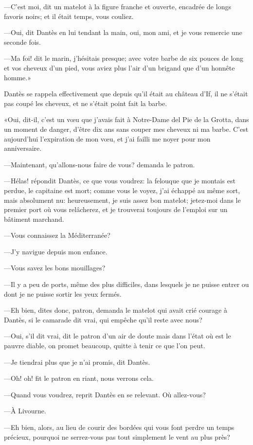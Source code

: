 —C'est moi, dit un matelot à la figure franche et ouverte, encadrée de longs favoris noirs; et il était temps, vous couliez.

—Oui, dit Dantès en lui tendant la main, oui, mon ami, et je vous remercie une seconde fois.

—Ma foi! dit le marin, j'hésitais presque; avec votre barbe de six pouces de long et vos cheveux d'un pied, vous aviez plus l'air d'un brigand que d'un honnête homme.»

Dantès se rappela effectivement que depuis qu'il était au château d'If, il ne s'était pas coupé les cheveux, et ne s'était point fait la barbe.

«Oui, dit-il, c'est un vœu que j'avais fait à Notre-Dame del Pie de la Grotta, dans un moment de danger, d'être dix ans sans couper mes cheveux ni ma barbe. C'est aujourd'hui l'expiration de mon vœu, et j'ai failli me noyer pour mon anniversaire.

—Maintenant, qu'allons-nous faire de vous? demanda le patron.

—Hélas! répondit Dantès, ce que vous voudrez: la felouque que je montais est perdue, le capitaine est mort; comme vous le voyez, j'ai échappé au même sort, mais absolument nu: heureusement, je suis assez bon matelot; jetez-moi dans le premier port où vous relâcherez, et je trouverai toujours de l'emploi sur un bâtiment marchand.

—Vous connaissez la Méditerranée?

—J'y navigue depuis mon enfance.

—Vous savez les bons mouillages?

—Il y a peu de ports, même des plus difficiles, dans lesquels je ne puisse entrer ou dont je ne puisse sortir les yeux fermés.

—Eh bien, dites donc, patron, demanda le matelot qui avait crié courage à Dantès, si le camarade dit vrai, qui empêche qu'il reste avec nous?

—Oui, s'il dit vrai, dit le patron d'un air de doute mais dans l'état où est le pauvre diable, on promet beaucoup, quitte à tenir ce que l'on peut.

—Je tiendrai plus que je n'ai promis, dit Dantès.

—Oh! oh! fit le patron en riant, nous verrons cela.

—Quand vous voudrez, reprit Dantès en se relevant. Où allez-vous?

—À Livourne.

—Eh bien, alors, au lieu de courir des bordées qui vous font perdre un temps précieux, pourquoi ne serrez-vous pas tout simplement le vent au plus près?

